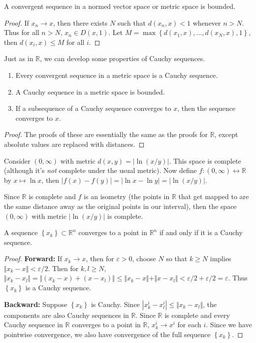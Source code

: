 \documentclass[10pt]{report}
\begin{document}
\begin{prop}
	A convergent sequence in a normed vector space or metric space is bounded.
\end{prop}
\begin{proof}
	If $x_n  \to x$, then there exists $N$ such that $d(x_n , x) < 1$ whenever $n > N$. Thus for all $n > N$, $x_n \in D(x,1)$. Let $M = \max\left\{ d(x_1,x), \dots, d(x_{N},x), 1 \right\}$, then $d(x_i, x) \leq M$ for all $i$.
\end{proof}

\begin{prop}
	Just as in $\mathbb{R}$, we can develop some properties of Cauchy sequences.
	\begin{enumerate}
		\item Every convergent sequence in a metric space is a Cauchy sequence.
		\item A Cauchy sequence in a metric space is bounded.
		\item If a subsequence of a Cauchy sequence converges to $x$, then the sequence converges to $x$.
	\end{enumerate}
\end{prop}
\begin{proof}
	The proofs of these are essentially the same as the proofs for $\mathbb{R}$, except absolute values are replaced with distances.
\end{proof}

\begin{ex}{}{}
	Consider $(0,\infty)$ with metric $d(x,y) = | \ln(x/y) | $. This space is complete (although it's \textit{not} complete under the usual metric). Now define $f:(0,\infty) \leftrightarrow \mathbb{R}$ by $x \mapsto \ln x$, then $|f(x)-f(y)|=|\ln x - \ln y| = |\ln (x/y)|$.

	Since $\mathbb{R}$ is complete and $f$ is an isometry (the points in $\mathbb{R}$ that get mapped to are the same distance away as the original points in our interval), then the space $(0,\infty)$ with metric $|\ln(x/y)|$ is complete.
\end{ex}

\begin{thrm}{}{}
	A sequence $\left\{ x_k \right\} \subset \mathbb{R}^n$ converges to a point in $\mathbb{R}^n$ if and only if it is a Cauchy sequence.
\end{thrm}
\begin{proof}
	\textbf{Forward:} If $x_k \to x$, then for $\varepsilon>0$, choose $N$ so that $k \geq N$ implies $\Vert{x_k-x}\Vert<\varepsilon/2$. Then for $k,l \geq N$, $\Vert{x_k-x_l}\Vert=\Vert{(x_k-x)+(x-x_l)}\Vert \leq \Vert{x_k-x}\Vert+\Vert{x-x_l}\Vert < \varepsilon/2 + \varepsilon/2 = \varepsilon$. Thus $\left\{ x_k \right\}$ is a Cauchy sequence.

	\textbf{Backward:} Suppose $\left\{ x_k \right\}$ is Cauchy. Since $|x_k^i - x_l^i| \leq \Vert{x_k-x_l}\Vert$, the components are also Cauchy sequences in $\mathbb{R}$. Since $\mathbb{R}$ is complete and every Cauchy sequence in $\mathbb{R}$ converges to a point in $\mathbb{R}$, $x_k^i \to x^i$ for each $i$. Since we have pointwise convergence, we also have convergence of the full sequence $\left\{ x_k \right\}$.
\end{proof}
\end{document}
